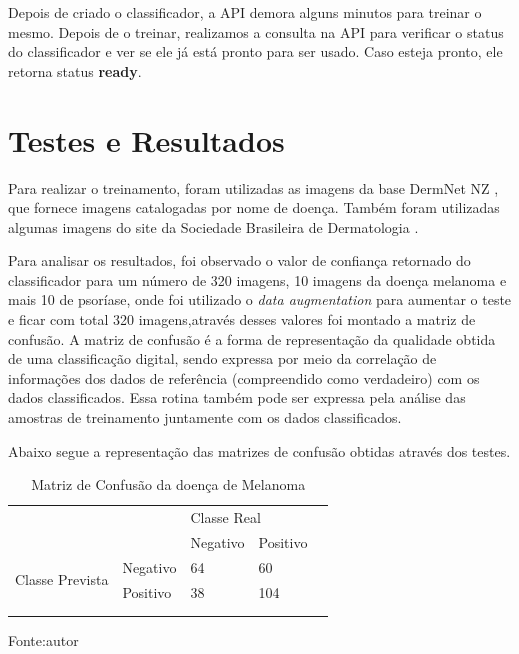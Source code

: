 \documentclass[openright]{ifrs} %
\begin{document}
Depois de criado o classificador, a API demora alguns minutos para treinar o mesmo. Depois de o treinar, realizamos a consulta na API para verificar o status do classificador e ver se ele já está pronto para ser usado. Caso esteja pronto, ele retorna status \textbf{ready}. 

\clearpage

\section{Testes e Resultados}
Para  realizar o treinamento, foram utilizadas  as imagens da base DermNet NZ \cite{dermnetnzsite}, que fornece imagens catalogadas por nome de doença.
Também foram utilizadas algumas imagens do site da Sociedade Brasileira de Dermatologia \cite{SBC}.

Para analisar os resultados, foi observado o valor de confiança retornado do classificador para um número  de 320 imagens, 10 imagens da doença melanoma e mais 10 de psoríase, onde foi utilizado o \textit{data augmentation} para aumentar o teste e ficar com total 320 imagens,através desses valores foi montado  a  matriz de confusão. A matriz de confusão é a forma de representação da qualidade obtida de uma classificação digital, sendo expressa por meio da correlação de informações dos dados de referência (compreendido como verdadeiro) com os dados classificados. Essa rotina também pode ser expressa pela análise das amostras de treinamento juntamente com os dados classificados.


Abaixo segue a representação das matrizes de confusão obtidas através dos testes.

\begin{table}[h]
\centering
\caption{Matriz de Confusão da doença de Melanoma}

\label{mconfusao_melanoma}

\begin{tabular}{lllll}
\cline{1-4}
\multicolumn{2}{|l|}{\multirow{2}{*}{}}                                                & \multicolumn{2}{l|}{Classe Real}                              &  \\ \cline{3-4}
\multicolumn{2}{|l|}{}                                                                 & \multicolumn{1}{l|}{Negativo} & \multicolumn{1}{l|}{Positivo} &  \\ \cline{1-4}
\multicolumn{1}{|l|}{\multirow{2}{*}{Classe Prevista}} & \multicolumn{1}{l|}{Negativo} & \multicolumn{1}{l|}{64}        & \multicolumn{1}{l|}{60}        &  \\ \cline{2-4}
\multicolumn{1}{|l|}{}                                 & \multicolumn{1}{l|}{Positivo} & \multicolumn{1}{l|}{38}        & \multicolumn{1}{l|}{104}        &  \\ \cline{1-4}
                                                       &                               &                               &                               &  \\
                                                       &                               &                               &                               & 
\end{tabular}
\centerline{Fonte:autor}
\end{table}
\end{document}
